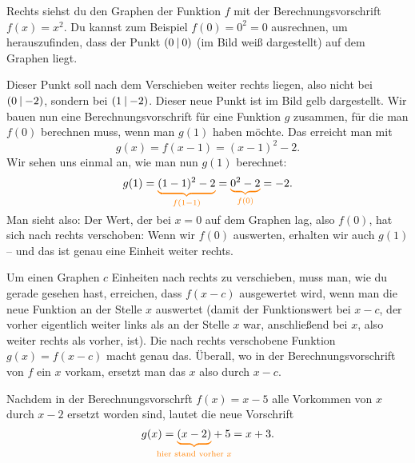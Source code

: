 \documentclass[../../main.tex]{subfiles}
\begin{document}
\begin{example}{}

    Rechts siehst du den Graphen der Funktion $f$ mit der Berechnungsvorschrift $f(x)=x^2$. Du kannst zum Beispiel $f(0)=0^2=0$ ausrechnen, um herauszufinden, dass der Punkt $\left(0 \:\middle|\: 0\right)$ (im Bild weiß dargestellt) auf dem Graphen liegt.
    
    Dieser Punkt soll nach dem Verschieben weiter rechts liegen, also nicht bei $\left(0 \:\middle|\: -2\right)$, sondern bei $\left(1 \:\middle|\: -2\right)$. Dieser neue Punkt ist im Bild gelb dargestellt. Wir bauen nun eine Berechnungsvorschrift für eine Funktion $g$ zusammen, für die man $f(0)$ berechnen muss, wenn man $g(1)$ haben möchte. Das erreicht man mit \[g(x)=f(x-1)=(x-1)^2-2.\]
    Wir sehen uns einmal an, wie man nun $g(1)$ berechnet: \[g(1)=\colorbrace{(1-1)^2-2}{f(1-1)}=\colorbrace{0^2-2}{f(0)}=-2.\]
    Man sieht also: Der Wert, der bei $x=0$ auf dem Graphen lag, also $f(0)$, hat sich nach rechts verschoben: Wenn wir $f(0)$ auswerten, erhalten wir auch $g(1)$ -- und das ist genau eine Einheit weiter rechts.
\end{example}

Um einen Graphen $c$ Einheiten nach rechts zu verschieben, muss man, wie du gerade gesehen hast, erreichen, dass $f(x-c)$ ausgewertet wird, wenn man die neue Funktion an der Stelle $x$ auswertet (damit der Funktionswert bei $x-c$, der vorher eigentlich weiter links als an der Stelle $x$ war, anschließend bei $x$, also weiter rechts als vorher, ist). Die nach rechts verschobene Funktion $g(x)=f(x-c)$ macht genau das. Überall, wo in der Berechnungsvorschrift von $f$ ein $x$ vorkam, ersetzt man das $x$ also durch $x-c$.

\begin{example}{}
    Nachdem in der Berechnungsvorschrft $f(x)=x-5$ alle Vorkommen von $x$ durch $x-2$ ersetzt worden sind, lautet die neue Vorschrift 
    \[g(x)=\colorbrace{(x-2)}{\text{hier stand vorher }x}+5=x+3.\]
\end{example}
\end{document}
